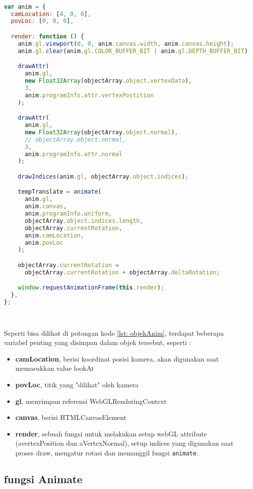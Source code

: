 \begin{lstlisting}[language=javascript, label={lst: objekAnim}, caption={objek anim}]

var anim = {
  camLocation: [4, 0, 0],
  povLoc: [0, 0, 0],

  render: function () {
    anim.gl.viewport(0, 0, anim.canvas.width, anim.canvas.height);
    anim.gl.clear(anim.gl.COLOR_BUFFER_BIT | anim.gl.DEPTH_BUFFER_BIT);

    drawAttr(
      anim.gl,
      new Float32Array(objectArray.object.vertexData),
      3,
      anim.programInfo.attr.vertexPostition
    );

    drawAttr(
      anim.gl,
      new Float32Array(objectArray.object.normal),
      // objectArray.object.normal,
      3,
      anim.programInfo.attr.normal
    );

    drawIndices(anim.gl, objectArray.object.indices);

    tempTranslate = animate(
      anim.gl,
      anim.canvas,
      anim.programInfo.uniform,
      objectArray.object.indices.length,
      objectArray.currentRotation,
      anim.camLocation,
      anim.povLoc
    );

    objectArray.currentRotation =
      objectArray.currentRotation + objectArray.deltaRotation;

    window.requestAnimationFrame(this.render);
  },
};

  
\end{lstlisting}

Seperti bisa dilihat di potongan kode \ref{lst: objekAnim}, terdapat beberapa variabel penting yang disimpan dalam objek tersebut, seperti :

\begin{itemize}
  \item \textbf{camLocation}, berisi koordinat posisi kamera, akan digunakan saat memasukkan value lookAt
  \item \textbf{povLoc}, titik yang "dilihat" oleh kamera
  \item \textbf{gl}, menyimpan referensi WebGLRenderingContext
  \item \textbf{canvas}, berisi HTMLCanvasElement
  \item \textbf{render}, sebuah fungsi untuk melakukan setup webGL attribute (avertexPosition dan aVertexNormal), setup indices yang digunakan saat proses draw, mengatur rotasi dan memanggil fungsi \texttt{animate}.
\end{itemize}

\subsection*{fungsi Animate}

